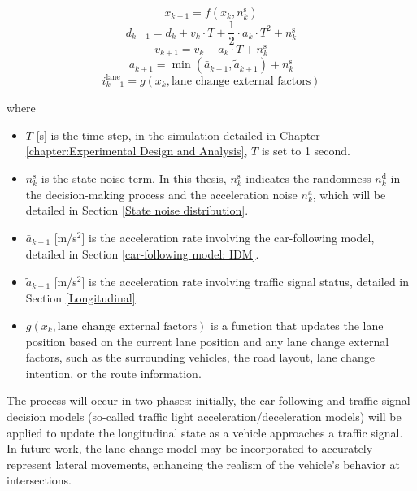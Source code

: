\begin{equation}
    x_{k+1} = f(x_k, n_k^\text{s}) 
\end{equation}
\begin{equation}
    d_{k+1} = d_k + v_k \cdot T + \frac{1}{2} \cdot a_k \cdot T^2  +  n_k^\text{s}  
\end{equation}
\begin{equation}
    v_{k+1} = v_k +  a_k \cdot T +  n_k^\text{s}  
\end{equation}
\begin{equation}
    a_{k+1} = \min (\bar a_{k+1}, \tilde a_{k+1}) +  n_k^\text{s}  
\end{equation}
\begin{equation}
    i_{k+1}^{\text{lane}} = g(x_k, \text{lane change external factors})
\end{equation}

where
\begin{itemize}
    \item $T$ [s] is the time step, in the simulation detailed in Chapter \ref{chapter:Experimental Design and Analysis}, $T$ is set to 1 second.
    \item $n_k^\text{s}$ is the state noise term. In this thesis, $n_k^\text{s}$ indicates the randomness $n_k^\text{d}$ in the decision-making process and the acceleration noise $n_k^\text{a}$, which will be detailed in Section \ref{State noise distribution}.
    \item $\bar a_{k+1}$ [m/s$^2$] is the acceleration rate involving the car-following model, detailed in Section \ref{car-following model: IDM}.
    \item $\tilde a_{k+1}$ [m/s$^2$] is the acceleration rate involving traffic signal status, detailed in Section \ref{Longitudinal}.
    \item $g(x_k, \text{lane change external factors})$ is a function that updates the lane position based on the current lane position and any lane change external factors, such as the surrounding vehicles, the road layout, lane change intention, or the route information.
\end{itemize}
The process will occur in two phases: initially, the car-following and traffic signal decision models (so-called traffic light acceleration/deceleration models) will be applied to update the longitudinal state as a vehicle approaches a traffic signal. In future work, the lane change model may be incorporated to accurately represent lateral movements, enhancing the realism of the vehicle's behavior at intersections.


